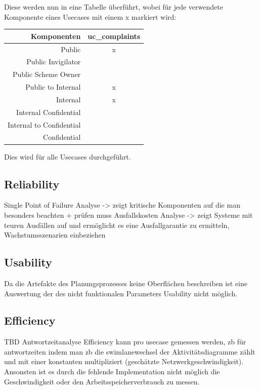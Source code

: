 Diese werden nun in eine Tabelle überführt, wobei für jede verwendete Komponente eines Usecases mit einem x markiert wird:

\hfill \break

\begin{tabular}{ | r | c | }
    \hline
    Komponenten & uc\_complaints \\
    \hline
    Public & x \\
    \hline
    Public Invigilator & \\
    \hline
    Public Scheme Owner & \\
    \hline
    Public to Internal & x \\
    \hline
    Internal & x \\
    \hline
    Internal Confidential & \\
    \hline
    Internal to Confidential & \\
    \hline
    Confidential & \\
    \hline
\end{tabular}

\hfill \break

Dies wird für alle Usecases durchgeführt.

\subsection{Reliability}
Single Point of Failure Analyse -> zeigt kritische Komponenten auf die man besonders beachten + prüfen muss
Ausfallskosten Analyse -> zeigt Systeme mit teuren Ausfällen auf und ermöglicht es eine Ausfallgarantie zu ermitteln, Wachstumsszenarien einbeziehen


\subsection{Usability}
Da die Artefakte des Planungsprozesses keine Oberflächen beschreiben ist eine Auswertung der des nicht funktionalen Parameters Usability nicht möglich.

\subsection{Efficiency}
TBD
Antwortzeitanalyse
Efficiency kann pro usecase gemessen werden, zb für antwortzeiten indem man zb die swimlanewechsel der Aktivitätsdiagramme zählt und mit einer konstanten multipliziert (geschätzte Netzwerkgeschwindigkeit). Ansonsten ist es durch die fehlende Implementation nicht möglich die Geschwindigkeit oder den Arbeitsspeicherverbrauch zu messen.


